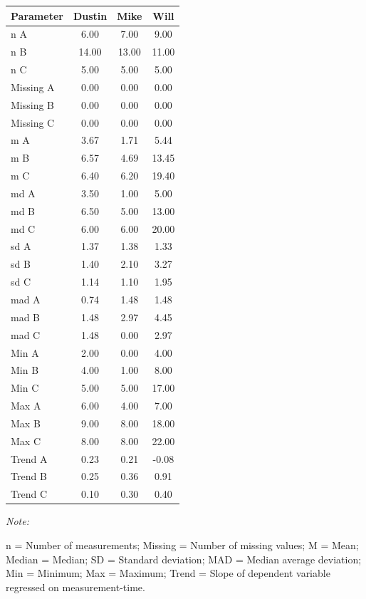 \documentclass[
]{book}
\begin{document}
\begin{threeparttable}
\begin{tabular}[t]{lccc}
\toprule
Parameter & Dustin & Mike & Will\\
\midrule
n A & 6.00 & 7.00 & 9.00\\
n B & 14.00 & 13.00 & 11.00\\
n C & 5.00 & 5.00 & 5.00\\
Missing A & 0.00 & 0.00 & 0.00\\
Missing B & 0.00 & 0.00 & 0.00\\
Missing C & 0.00 & 0.00 & 0.00\\
m A & 3.67 & 1.71 & 5.44\\
m B & 6.57 & 4.69 & 13.45\\
m C & 6.40 & 6.20 & 19.40\\
md A & 3.50 & 1.00 & 5.00\\
md B & 6.50 & 5.00 & 13.00\\
md C & 6.00 & 6.00 & 20.00\\
sd A & 1.37 & 1.38 & 1.33\\
sd B & 1.40 & 2.10 & 3.27\\
sd C & 1.14 & 1.10 & 1.95\\
mad A & 0.74 & 1.48 & 1.48\\
mad B & 1.48 & 2.97 & 4.45\\
mad C & 1.48 & 0.00 & 2.97\\
Min A & 2.00 & 0.00 & 4.00\\
Min B & 4.00 & 1.00 & 8.00\\
Min C & 5.00 & 5.00 & 17.00\\
Max A & 6.00 & 4.00 & 7.00\\
Max B & 9.00 & 8.00 & 18.00\\
Max C & 8.00 & 8.00 & 22.00\\
Trend A & 0.23 & 0.21 & -0.08\\
Trend B & 0.25 & 0.36 & 0.91\\
Trend C & 0.10 & 0.30 & 0.40\\
\bottomrule
\end{tabular}
\begin{tablenotes}
\item \textit{Note: } 
\item n = Number of measurements; Missing = Number of missing values; M = Mean; Median = Median; SD = Standard deviation; MAD = Median average deviation; Min = Minimum; Max = Maximum; Trend = Slope of dependent variable regressed on measurement-time.
\end{tablenotes}
\end{threeparttable}
\end{document}
